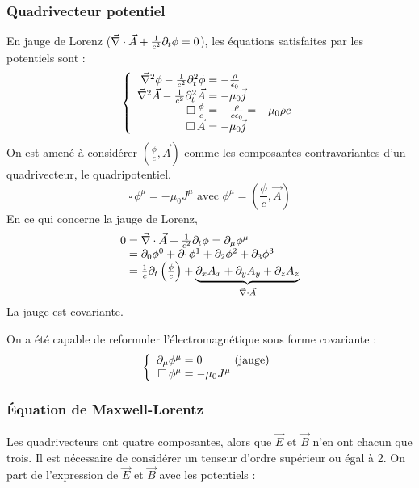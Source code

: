 \subsubsection{Quadrivecteur potentiel}
En jauge de Lorenz ($\vec{\nabla}\cdot\vec{A}+\frac{1}{c^2}\partial_t\phi=0$), les équations satisfaites par les potentiels sont :
$$
	\left\{ \begin{array}{r@{\;}l}
		\nab^2\phi - \frac{1}{c^2}\partial_t^2\phi&=-\frac{\rho}{\epsilon_0}\\
		\nab^2\vec{A}-\frac{1}{c^2}\partial_t^2\vec{A}&=-\mu_0\vec{j}\\
		\square\,\frac{\phi}{c}&=-\frac{\rho}{c\epsilon_0}=-\mu_0\rho c\\
		\square\,\vec{A}&=-\mu_0\vec{j}
	\end{array} \right.
$$
{\txt On est amené à considérer $(\frac{\phi}{c},\vec{A})$ comme les composantes contravariantes d'un quadrivecteur, le quadripotentiel.}
$$
	\square\,\phi^\mu=-\mu_0J^\mu
	\text{ avec } \phi^\mu=(\frac{\phi}{c},\vec{A})
$$
En ce qui concerne la jauge de Lorenz,
$$
	\begin{array}{r@{\;}l}
		0&=\nab\cdot\vec{A}+\frac{1}{c^2}\partial_t\phi=\partial_\mu\phi^\mu\\
		&=\partial_0\phi^0+\partial_1\phi^1+\partial_2\phi^2+\partial_3\phi^3\\
		&=\frac{1}{c}\partial_t\left(\frac{\phi}{c}\right)+\underbrace{\partial_xA_x+\partial_yA_y+\partial_zA_z}_{\nab\cdot\vec{A}}
	\end{array}
$$
La jauge est covariante.

\begin{conc}
	On a été capable de reformuler l'électromagnétique sous forme covariante :
	$$
		\left\{ \begin{array}{r@{\;}l}
			\partial_\mu\phi^\mu&=0\text{\hspace{1cm}(jauge)}\\
			\square\,\phi^\mu&=-\mu_0J^\mu
		\end{array} \right.
	$$
\end{conc}

\subsubsection{Équation de Maxwell-Lorentz}
	Les quadrivecteurs ont quatre composantes, alors que $\vec{E}$ et $\vec{B}$ n'en ont chacun que trois. Il est nécessaire de considérer un tenseur d'ordre supérieur ou égal à 2. On part de l'expression de $\vec{E}$ et $\vec{B}$ avec les potentiels :

